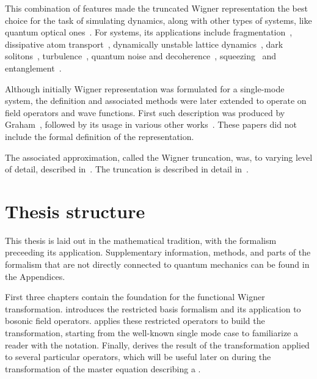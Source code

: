 This combination of features made the truncated Wigner representation the best choice for the task of simulating  dynamics, along with other types of systems, like quantum optical ones~\cite{Drummond1993,Drummond1993a,Corney2008,Corney2006}.
For  systems, its applications include fragmentation~\cite{Isella2006,Isella2005,Gross2011}, dissipative atom transport~\cite{Ruostekoski2005}, dynamically unstable lattice dynamics~\cite{Shrestha2009}, dark solitons~\cite{Martin2010,Martin2010a}, turbulence~\cite{Norrie2005,Norrie2006}, quantum noise and decoherence~\cite{Steel1998,Norrie2006a,Egorov2011}, squeezing~\cite{Opanchuk2012} and entanglement~\cite{Opanchuk2012a}.

Although initially Wigner representation was formulated for a single-mode system, the definition and associated methods were later extended to operate on field operators and wave functions.
First such description was produced by Graham~\cite{Graham1970,Graham1970a}, followed by its usage in various other works~\cite{Steel1998,Gardiner2003,Isella2006,Norrie2006,Norrie2006a,Blakie2008,Martin2010,Polkovnikov2010,Gross2011}.
These papers did not include the formal definition of the representation.

The associated approximation, called the Wigner truncation, was, to varying level of detail, described in~\cite{Drummond1993,Steel1998,Sinatra2002}.
The truncation is described in detail in~.


\section{Thesis structure}

This thesis is laid out in the mathematical tradition, with the formalism preceeding its application.
Supplementary information, methods, and parts of the formalism that are not directly connected to quantum mechanics can be found in the Appendices.

First three chapters contain the foundation for the functional Wigner transformation.
 introduces the restricted basis formalism and its application to bosonic field operators.
 applies these restricted operators to build the transformation, starting from the well-known single mode case to familiarize a reader with the notation.
Finally,  derives the result of the transformation applied to several particular operators, which will be useful later on during the transformation of the master equation describing a .

